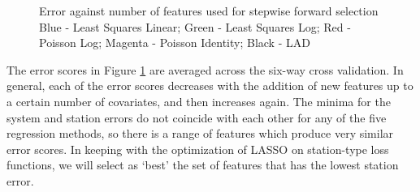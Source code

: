 \documentclass[11pt]{article}
\begin{document}
\begin{figure}
\centering
{}
\captionsetup{singlelinecheck=off, font=scriptsize, justification=centering}
\caption[]{
Error against number of features used for stepwise forward selection\linebreak
Blue - Least Squares Linear; Green - Least Squares Log; Red - Poisson Log; Magenta - Poisson Identity; Black - LAD
}
\label{fig:bfscores}
\end{figure}

The error scores in Figure \ref{fig:bfscores} are averaged across the six-way cross validation. In general, each of the error scores decreases with the addition of new features up to a certain number of covariates, and then increases again. The minima for the system and station errors do not coincide with each other for any of the five regression methods, so there is a range of features which produce very similar error scores. In keeping with the optimization of LASSO on station-type loss functions, we will select as `best' the set of features that has the lowest station error. 
\end{document}
